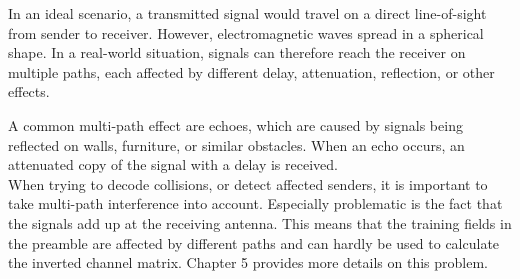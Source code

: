 In an ideal scenario, a transmitted signal would travel on a direct line-of-sight from sender to receiver. However, electromagnetic waves spread in a spherical shape. In a real-world situation, signals can therefore reach the receiver on multiple paths, each affected by different delay, attenuation, reflection, or other effects.

A common multi-path effect are echoes, which are caused by signals being reflected on walls, furniture, or similar obstacles. When an echo occurs, an attenuated copy of the signal with a delay is received.\\

When trying to decode collisions, or detect affected senders, it is important to take multi-path interference into account. Especially problematic is the fact that the signals add up at the receiving antenna. This means that the training fields in the preamble are affected by different paths and can hardly be used to calculate the inverted channel matrix. Chapter 5 provides more details on this problem.
